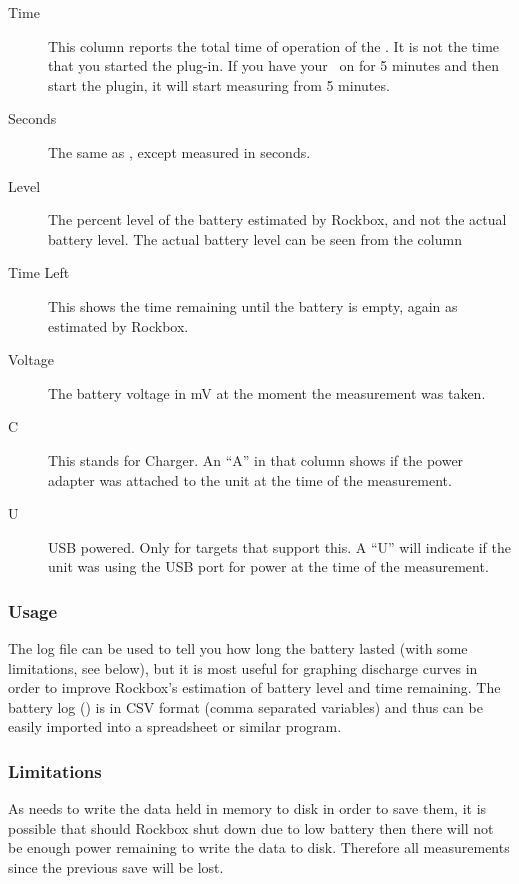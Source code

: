\begin{description}
\item[Time] This column reports the total time of operation of the \dap. It is 
not the time that you started the plug-in. If you have your \dap\ on for 5 
minutes and then start the plugin, it will start measuring from 5 minutes.
\item[Seconds] The same as , except measured in seconds.
\item[Level] The percent level of the battery estimated by Rockbox, and not the
actual battery level. The actual battery level can be seen from the
 column
\item[Time Left] This shows the time remaining until the battery is empty,
again as estimated by Rockbox.
\item[Voltage] The battery voltage in mV at the moment the measurement
was taken.
\item[C] This stands for Charger. An ``A'' in that column shows if the power
adapter was attached to the unit at the time of the measurement.
\item[U] USB powered. Only for targets that support this. A ``U'' will indicate
if the unit was using the USB port for power at the time of the measurement. 
\end{description}

\subsubsection{Usage}
The log file can be used to tell you how long the battery lasted (with some
limitations, see below), but it is most useful for graphing discharge curves
in order to improve Rockbox's estimation of battery level and time remaining.
The battery log () is in CSV format
(comma separated variables) and thus can be easily imported into a spreadsheet
or similar program.

\subsubsection{Limitations}
As  needs to write the data held in memory to
disk in order to save them, it is possible that should Rockbox shut down
due to low battery then there will not be enough power remaining to write the
data to disk. Therefore all measurements since the previous save will be lost.
